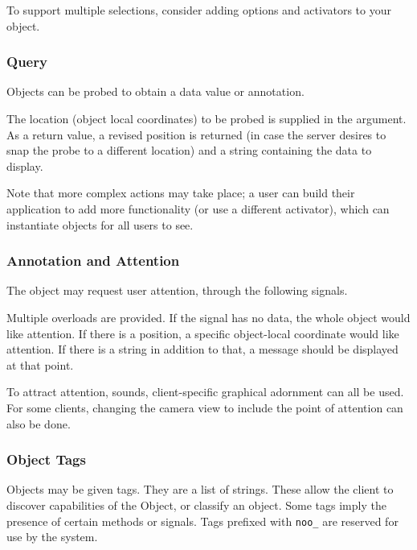 \documentclass[11pt, oneside]{amsart}
\begin{document}
To support multiple selections, consider adding options and activators to your object.

\subsubsection{Query}
Objects can be probed to obtain a data value or annotation.



The location (object local coordinates) to be probed is supplied in the argument. As a return value, a revised position is returned (in case the server desires to snap the probe to a different location) and a string containing the data to display.

Note that more complex actions may take place; a user can build their application to add more functionality (or use a different activator), which can instantiate objects for all users to see.

\subsubsection{Annotation and Attention}

The object may request user attention, through the following signals.



Multiple overloads are provided. If the signal has no data, the whole object would like attention. If there is a position, a specific object-local coordinate would like attention. If there is a string in addition to that, a message should be displayed at that point.

To attract attention, sounds, client-specific graphical adornment can all be used. For some clients, changing the camera view to include the point of attention can also be done.

\subsubsection{Object Tags}

Objects may be given tags. They are a list of strings. These allow the client to discover capabilities of the Object, or classify an object. Some tags imply the presence of certain methods or signals. Tags prefixed with \texttt{noo\_} are reserved for use by the system.
\end{document}
